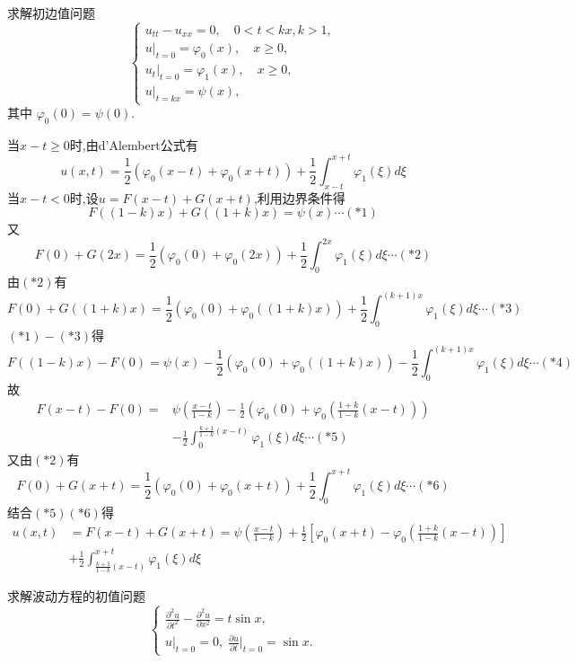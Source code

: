 \begin{exercise}
  求解初边值问题
  \[\begin{cases}
    u_{tt} - u_{xx} = 0,\quad 0<t<kx, k>1, \\
    u|_{t=0} = \varphi_0(x),\quad x\geq 0, \\
    u_t|_{t=0} = \varphi_1(x),\quad x\geq 0, \\
    u|_{t=kx} = \psi(x),
  \end{cases}\]
  其中 $\varphi_0(0) = \psi(0)$.
\end{exercise}

\begin{solve}
  当$x-t\geq 0$时,由d'Alembert公式有
  \[u(x,t)=\frac{1}{2}(\varphi_0(x-t)+\varphi_0(x+t))+\frac{1}{2}\int_{x-t}^{x+t}\varphi_1(\xi)d\xi\]
  当$x-t<0$时,设$u=F(x-t)+G(x+t)$,利用边界条件得
  \[F((1-k)x)+G((1+k)x)=\psi(x)\cdots(*1)\]
  又\[F(0)+G(2x)=\frac{1}{2}(\varphi_0(0)+\varphi_0(2x))+\frac{1}{2}\int_0^{2x}\varphi_1(\xi)d\xi\cdots(*2)\]
  由$(*2)$有
  \[F(0)+G((1+k)x)=\frac{1}{2}(\varphi_0(0)+\varphi_0((1+k)x))+\frac{1}{2}\int_0^{(k+1)x}\varphi_1(\xi)d\xi\cdots(*3)\]
  $(*1)-(*3)$得\[F((1-k)x)-F(0)=\psi(x)-\frac{1}{2}(\varphi_0(0)+\varphi_0((1+k)x))-\frac{1}{2}\int_0^{(k+1)x}\varphi_1(\xi)d\xi\cdots(*4)\]
  故\[\begin{split}F(x-t)-F(0)=&\psi\left(\frac{x-t}{1-k}\right)-\frac{1}{2}\left(\varphi_0(0)+\varphi_0\left(\frac{1+k}{1-k}(x-t)\right)\right)\\&-\frac{1}{2}\int_0^{\frac{k+1}{1-k}(x-t)}\varphi_1(\xi)d\xi\cdots(*5)\end{split}\]
  又由$(*2)$有\[F(0)+G(x+t)=\frac{1}{2}(\varphi_0(0)+\varphi_0(x+t))+\frac{1}{2}\int_0^{x+t}\varphi_1(\xi)d\xi\cdots(*6)\]
  结合$(*5)(*6)$得\[\begin{split}u(x,t)&=F(x-t)+G(x+t)=\psi\left(\frac{x-t}{1-k}\right)+\frac{1}{2}\left[\varphi_0(x+t)-\varphi_0\left(\frac{1+k}{1-k}(x-t)\right)\right]\\&+\frac{1}{2}\int_{\frac{k+1}{1-k}(x-t)}^{x+t}\varphi_1(\xi)d\xi\end{split}\]
\end{solve}


\begin{exercise}[8]
  求解波动方程的初值问题
  \[
    \begin{cases}
      \frac{\partial^2u}{\partial t^2} - \frac{\partial^2u}{\partial x^2} = t\sin x, \\
      u|_{t=0} = 0,\; \frac{\partial u}{\partial t}\Big|_{t=0} = \sin x.
    \end{cases}
  \]
\end{exercise}

